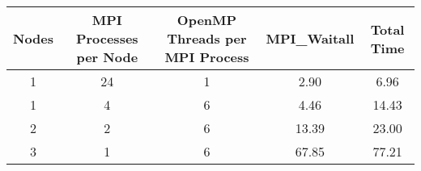 \begin{tabular}{ccccc}
    \toprule
    \textbf{Nodes} & \textbf{MPI Processes per Node} & \textbf{OpenMP Threads per MPI Process} & \textbf{MPI\_Waitall} & \textbf{Total Time} \\
    \midrule
    1 & 24 & 1 & 2.90 & 6.96 \\
    1 & 4 & 6 & 4.46 & 14.43 \\
    2 & 2 & 6 & 13.39 & 23.00 \\
    3 & 1 & 6 & 67.85 & 77.21 \\
    \bottomrule
\end{tabular}
